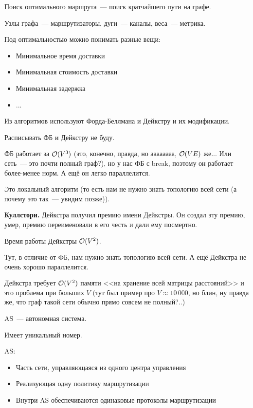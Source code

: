 Поиск оптимального маршрута~--- поиск кратчайшего пути на графе.

Узлы графа~--- маршрутизаторы, дуги~--- каналы, веса~--- метрика.

Под оптимальностью можно понимать разные вещи:
\begin{itemize}
    \item Минимальное время доставки
    \item Минимальная стоимость доставки
    \item Минимальная задержка
    \item ...
\end{itemize}

Из алгоритмов используют Форда-Беллмана и Дейкстру и их модификации.

Расписывать ФБ и Дейкстру не буду.

ФБ работает за $\mathcal{O}(V^3)$ (это, конечно, правда, но аааааааа, $\mathcal{O}(VE)$ же... Или сеть~--- это почти полный граф?), но у нас ФБ с break, поэтому он работает более-менее норм. А ещё он легко параллелится.

Это локальный алгоритм (то есть нам не нужно знать топологию всей сети (а почему это так~--- увидим позже)).

{\bf Куллстори.} Дейкстра получил премию имени Дейкстры. Он создал эту премию, умер, премию переименовали в его честь и дали ему посмертно.

Время работы Дейкстры $\mathcal{O}(V^2)$.

Тут, в отличие от ФБ, нам нужно знать топологию всей сети. А ещё Дейкстра не очень хорошо параллелится.

Дейкстра требует $\mathcal{O}(V^2)$ памяти <<на хранение всей матрицы расстояний>> и это проблема при больших $V$ (тут был пример про $V\approx 10\,000$, но блин, ну правда же, что граф такой сети обычно прямо совсем не полный?..) 


AS~--- автономная система.

Имеет уникальный номер.

AS:
\begin{itemize}
    \item Часть сети, управляющаяся из одного центра управления
    \item Реализующая одну политику маршрутизации
    \item Внутри AS обеспечиваются одинаковые протоколы маршрутизации
\end{itemize}


